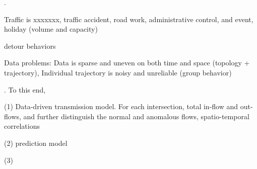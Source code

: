 {.
\bi
\item Traffic is xxxxxxx, \eg traffic accident, road work, administrative control, and event, holiday (volume and capacity)
\item detour behaviors
\item Data problems: Data is sparse and uneven on both time and space (topology + trajectory), Individual trajectory is noisy and unreliable (group behavior)
\ei

. To this end,

\ni (1) Data-driven transmission model. For each intersection, total in-flow and out-flows, and further distinguish the normal and anomalous flows, spatio-temporal correlations

\ni (2) prediction model

\ni (3)

}